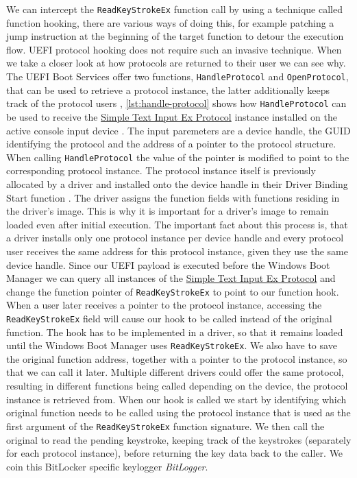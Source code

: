 We can intercept the \lstinline{ReadKeyStrokeEx} function call by using a technique called function hooking, there are various ways of doing this, for example patching a jump instruction at the beginning of the target function to detour the execution flow.
 \ac{UEFI} protocol hooking does not require such an invasive technique.
When we take a closer look at how protocols are returned to their user we can see why.
The \ac{UEFI} Boot Services offer two functions, \lstinline{HandleProtocol} and \lstinline{OpenProtocol}, that can be used to retrieve a protocol instance, the latter additionally keeps track of the protocol users \cite[7.3. OpenProtocol]{uefi-spec}, \autoref{lst:handle-protocol} shows how \lstinline{HandleProtocol} can be used to receive the \hyperref[lst:simple-text-input-ex-protocol]{Simple Text Input Ex Protocol} instance installed on the active console input device \cite[4.3. EFI System Table]{uefi-spec}.
The input paremeters are a device handle, the \ac{GUID} identifying the protocol and the address of a pointer to the protocol structure.
When calling \lstinline{HandleProtocol} the value of the pointer is modified to point to the corresponding protocol instance.
The protocol instance itself is previously allocated by a driver and installed onto the device handle in their Driver Binding Start function .
The driver assigns the function fields with functions residing in the driver's image.
This is why it is important for a driver's image to remain loaded even after initial execution.
The important fact about this process is, that a driver installs only one protocol instance per device handle and every protocol user receives the same address for this protocol instance, given they use the same device handle.
Since our \ac{UEFI} payload is executed before the Windows Boot Manager we can query all instances of the \hyperref[lst:simple-text-input-ex-protocol]{Simple Text Input Ex Protocol} and change the function pointer of \lstinline{ReadKeyStrokeEx} to point to our function hook.
When a user later receives a pointer to the protocol instance, accessing the \lstinline{ReadKeyStrokeEx} field will cause our hook to be called instead of the original function.
The hook has to be implemented in a driver, so that it remains loaded until the Windows Boot Manager uses \lstinline{ReadKeyStrokeEx}.
We also have to save the original function address, together with a pointer to the protocol instance, so that we can call it later.
Multiple different drivers could offer the same protocol, resulting in different functions being called depending on the device, the protocol instance is retrieved from.
When our hook is called we start by identifying which original function needs to be called using the protocol instance that is used as the first argument of the \lstinline{ReadKeyStrokeEx} function signature.
We then call the original to read the pending keystroke, keeping track of the keystrokes (separately for each protocol instance), before returning the key data back to the caller.
We coin this BitLocker specific keylogger \emph{BitLogger}.


